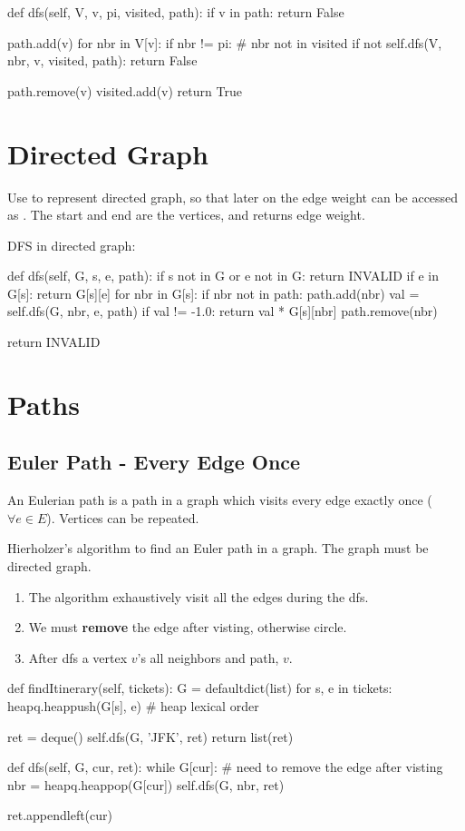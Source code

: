 \begin{python}
def dfs(self, V, v, pi, visited, path):
  if v in path:
    return False

  path.add(v)
  for nbr in V[v]:
    if nbr != pi:  # nbr not in visited
      if not self.dfs(V, nbr, v, visited, path):
        return False

  path.remove(v)
  visited.add(v)
  return True
\end{python}
\section{Directed Graph}
Use  to represent directed graph, so that later on the edge weight can be accessed as . The  start and  end are the vertices, and  returns edge weight.

 DFS in directed graph:
\begin{python}
def dfs(self, G, s, e, path):
    if s not in G or e not in G:
        return INVALID
    if e in G[s]:
        return G[s][e]
    for nbr in G[s]:
        if nbr not in path:
            path.add(nbr)
            val = self.dfs(G, nbr, e, path)
            if val != -1.0:
                return val * G[s][nbr]
            path.remove(nbr)

    return INVALID
\end{python}

\section{Paths}
\subsection{Euler Path - Every Edge Once} 
An Eulerian path is a path in a graph which visits every edge exactly once ($\forall e \in E$). Vertices can be repeated.

Hierholzer's algorithm to find an Euler path in a graph. The graph must be directed graph.

\begin{enumerate}
\item The algorithm exhaustively visit all the edges during the dfs. 
\item We must \textbf{remove} the edge after visting, otherwise circle.
\item After dfs a vertex $v$'s all neighbors and path,  $v$. 
\end{enumerate}
\begin{python}
def findItinerary(self, tickets):
    G = defaultdict(list)
    for s, e in tickets:
        heapq.heappush(G[s], e)  # heap lexical order

    ret = deque()
    self.dfs(G, 'JFK', ret)
    return list(ret)

def dfs(self, G, cur, ret):
    while G[cur]:
        # need to remove the edge after visting
        nbr = heapq.heappop(G[cur])
        self.dfs(G, nbr, ret)

    ret.appendleft(cur)
\end{python}

